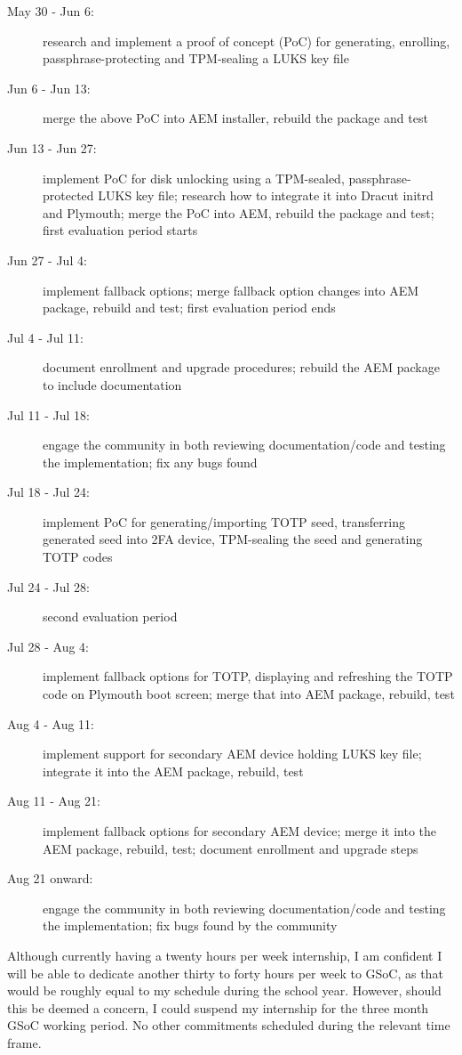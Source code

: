 \documentclass[10pt,a4paper,twocolumn]{article}
\begin{document}
\begin{description}
  \item[May 30 - Jun 6:] research and implement a proof of concept (PoC) for
    generating, enrolling, passphrase-protecting and TPM-sealing a LUKS key
    file
  \item[Jun 6 - Jun 13:] merge the above PoC into AEM installer, rebuild the
    package and test
  \item[Jun 13 - Jun 27:] implement PoC for disk unlocking using a TPM-sealed,
    passphrase-protected LUKS key file; research how to integrate it into
    Dracut initrd and Plymouth; merge the PoC into AEM, rebuild the package and
    test; first evaluation period starts
  \item[Jun 27 - Jul 4:] implement fallback options; merge fallback option
    changes into AEM package, rebuild and test; first evaluation period ends
  \item[Jul 4 - Jul 11:] document enrollment and upgrade procedures; rebuild
    the AEM package to include documentation
  \item[Jul 11 - Jul 18:] engage the community in both reviewing
    documentation/code and testing the implementation; fix any bugs found
  \item[Jul 18 - Jul 24:] implement PoC for generating/importing TOTP seed,
    transferring generated seed into 2FA device, TPM-sealing the seed and
    generating TOTP codes
  \item[Jul 24 - Jul 28:] second evaluation period
  \item[Jul 28 - Aug 4:] implement fallback options for TOTP, displaying and
    refreshing the TOTP code on Plymouth boot screen; merge that into AEM
    package, rebuild, test
  \item[Aug 4 - Aug 11:] implement support for secondary AEM device holding
    LUKS key file; integrate it into the AEM package, rebuild, test
  \item[Aug 11 - Aug 21:] implement fallback options for secondary AEM device;
    merge it into the AEM package, rebuild, test; document enrollment and
    upgrade steps
  \item[Aug 21 onward:] engage the community in both reviewing
    documentation/code and testing the implementation; fix bugs found by the
    community
\end{description}

Although currently having a twenty hours per week internship, I am confident I
will be able to dedicate another thirty to forty hours per week to GSoC, as
that would be roughly equal to my schedule during the school year. However,
should this be deemed a concern, I could suspend my internship for the three
month GSoC working period. No other commitments scheduled during the relevant
time frame.
\end{document}

